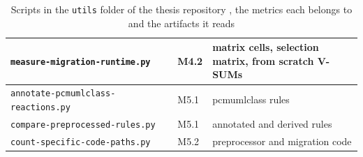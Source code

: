 \begin{table}[htbp]
\begin{tabular}{|l|l|l|}
        \hline
        \texttt{measure-migration-runtime.py}      & M4.2            & \makecell[l]{matrix cells, selection      \\ matrix, from scratch V-SUMs} \\
        \hline
        \texttt{annotate-pcmumlclass-reactions.py} & M5.1            & pcmumlclass rules                         \\
        \hline
        \texttt{compare-preprocessed-rules.py}     & M5.1            & annotated and derived rules               \\
        \hline
        \texttt{count-specific-code-paths.py}      & M5.2            & preprocessor and migration code           \\
        \hline
    \end{tabular}
    \caption{Scripts in the \texttt{utils} folder of the thesis repository \cite{thesis-repo}, the metrics each belongs to and the artifacts it reads}
    \label{table:evaluation-scripts}
\end{table}